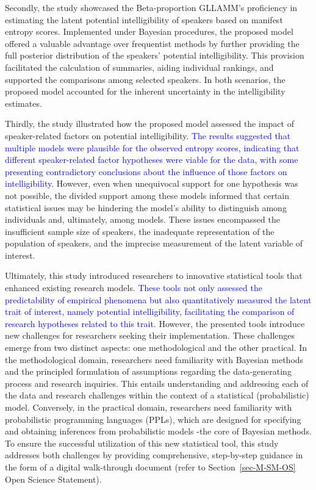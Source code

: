 \documentclass[
  authoryear,
  preprint,
  1p]{elsarticle}
\begin{document}
Secondly, the study showcased the Beta-proportion GLLAMM's proficiency
in estimating the latent potential intelligibility of speakers based on
manifest entropy scores. Implemented under Bayesian procedures, the
proposed model offered a valuable advantage over frequentist methods by
further providing the full posterior distribution of the speakers'
potential intelligibility. This provision facilitated the calculation of
summaries, aiding individual rankings, and supported the comparisons
among selected speakers. In both scenarios, the proposed model accounted
for the inherent uncertainty in the intelligibility estimates.

Thirdly, the study illustrated how the proposed model assessed the
impact of speaker-related factors on potential intelligibility. \textcolor{blue}{The
results suggested that multiple models were plausible for the observed
entropy scores, indicating that different speaker-related factor
hypotheses were viable for the data, with some presenting contradictory
conclusions about the influence of those factors on intelligibility.}
However, even when unequivocal support for one hypothesis was not
possible, the divided support among these models informed that certain
statistical issues may be hindering the model's ability to distinguish
among individuals and, ultimately, among models. These issues
encompassed the insufficient sample size of speakers, the inadequate
representation of the population of speakers, and the imprecise
measurement of the latent variable of interest.

Ultimately, this study introduced researchers to innovative statistical
tools that enhanced existing research models. \textcolor{blue}{These tools not only
assessed the predictability of empirical phenomena but also
quantitatively measured the latent trait of interest, namely potential
intelligibility, facilitating the comparison of research hypotheses
related to this trait.} However, the presented tools introduce new
challenges for researchers seeking their implementation. These
challenges emerge from two distinct aspects: one methodological and the
other practical. In the methodological domain, researchers need
familiarity with Bayesian methods and the principled formulation of
assumptions regarding the data-generating process and research
inquiries. This entails understanding and addressing each of the data
and research challenges within the context of a statistical
(probabilistic) model. Conversely, in the practical domain, researchers
need familiarity with probabilistic programming languages (PPLs), which
are designed for specifying and obtaining inferences from probabilistic
models -the core of Bayesian methods. To ensure the successful
utilization of this new statistical tool, this study addresses both
challenges by providing comprehensive, step-by-step guidance in the form
of a digital walk-through document (refer to Section~\ref{sec-M-SM-OS}
Open Science Statement).
\end{document}

